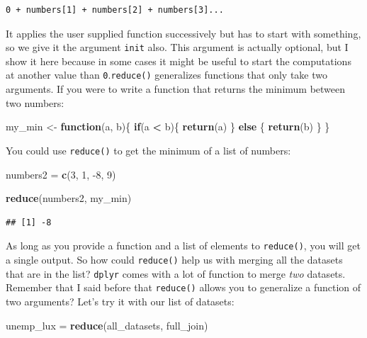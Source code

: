 \documentclass[]{gitbook}
\newenvironment{Shaded}{\begin{snugshade}}{\end{snugshade}}
\newcommand{\ControlFlowTok}[1]{\textcolor[rgb]{0.13,0.29,0.53}{\textbf{#1}}}
\newcommand{\DecValTok}[1]{\textcolor[rgb]{0.00,0.00,0.81}{#1}}
\newcommand{\KeywordTok}[1]{\textcolor[rgb]{0.13,0.29,0.53}{\textbf{#1}}}
\newcommand{\NormalTok}[1]{#1}
\newcommand{\OperatorTok}[1]{\textcolor[rgb]{0.81,0.36,0.00}{\textbf{#1}}}
\newcommand{\StringTok}[1]{\textcolor[rgb]{0.31,0.60,0.02}{#1}}
\begin{document}
\begin{verbatim}
0 + numbers[1] + numbers[2] + numbers[3]...
\end{verbatim}

It applies the user supplied function successively but has to start with something, so we give it
the argument \texttt{init} also. This argument is actually optional, but I show it here because in some
cases it might be useful to start the computations at another value than \texttt{0}.\texttt{reduce()}
generalizes functions that only take two arguments. If you were to write a function that returns
the minimum between two numbers:

\begin{Shaded}
\begin{Highlighting}[]
\NormalTok{my_min <-}\StringTok{ }\ControlFlowTok{function}\NormalTok{(a, b)\{}
    \ControlFlowTok{if}\NormalTok{(a }\OperatorTok{<}\StringTok{ }\NormalTok{b)\{}
        \KeywordTok{return}\NormalTok{(a)}
\NormalTok{    \} }\ControlFlowTok{else}\NormalTok{ \{}
        \KeywordTok{return}\NormalTok{(b)}
\NormalTok{    \}}
\NormalTok{\}}
\end{Highlighting}
\end{Shaded}

You could use \texttt{reduce()} to get the minimum of a list of numbers:

\begin{Shaded}
\begin{Highlighting}[]
\NormalTok{numbers2 =}\StringTok{ }\KeywordTok{c}\NormalTok{(}\DecValTok{3}\NormalTok{, }\DecValTok{1}\NormalTok{, }\DecValTok{-8}\NormalTok{, }\DecValTok{9}\NormalTok{)}

\KeywordTok{reduce}\NormalTok{(numbers2, my_min)}
\end{Highlighting}
\end{Shaded}

\begin{verbatim}
## [1] -8
\end{verbatim}

As long as you provide a function and a list of elements to \texttt{reduce()}, you will get a single
output. So how could \texttt{reduce()} help us with merging all the datasets that are in the list? \texttt{dplyr}
comes with a lot of function to merge \emph{two} datasets. Remember that I said before that \texttt{reduce()}
allows you to generalize a function of two arguments? Let's try it with our list of datasets:

\begin{Shaded}
\begin{Highlighting}[]
\NormalTok{unemp_lux =}\StringTok{ }\KeywordTok{reduce}\NormalTok{(all_datasets, full_join)}
\end{Highlighting}
\end{Shaded}
\end{document}
